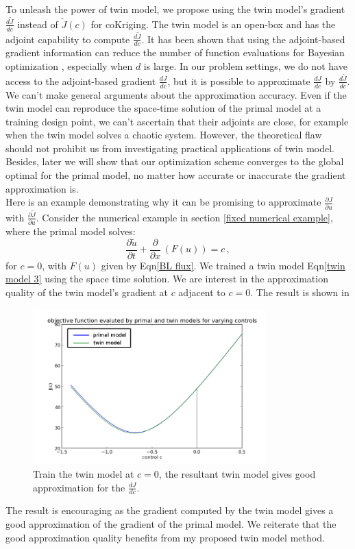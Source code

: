 \documentclass[a4paper,onecolumn]{article}
\theoremstyle{remark}
\begin{document}
\noindent To unleash the power of twin model, we propose using the twin model's gradient
$\frac{d\tilde{J}}{d c}$ instead of $\tilde{J}(c)$ for coKriging.
The twin model is an open-box and has the adjoint capability to compute $\frac{d\tilde{J}}{dc}$.
It has been shown that using the adjoint-based gradient information can 
reduce the number of function evaluations for Bayesian optimization
\cite{adjoint gradient cokriging without MLE, gradient kriging surrogate},
especially when $d$ is large. 
In our problem settings, we do not have access to the adjoint-based gradient $\frac{dJ}{dc}$,
but it is possible to approximate $\frac{dJ}{dc}$ by $\frac{d\tilde{J}}{dc}$.
We can't make general arguments about the approximation accuracy. 
Even if the twin model can reproduce the space-time solution of the primal model
at a training design point, we can't ascertain that their adjoints 
are close, for example when the twin model solves a chaotic system.
However, the theoretical flaw should not prohibit us from investigating
practical applications of twin model. Besides, later we will show that our optimization scheme 
converges to the global optimal for the primal model,
no matter how accurate or inaccurate the gradient approximation is.\\

\noindent Here is an example demonstrating why it can be promising to approximate
$\frac{\partial J}{\partial u}$ with $\frac{\partial \tilde{J}}{\partial u}$.
Consider the numerical example in section \ref{fixed numerical example}, where the
primal model solves:
\begin{equation}
    \frac{\partial \tilde{u}}{\partial t} + \frac{\partial}{\partial x}\,
    \left(F(u)\right) = c\,,
\end{equation}
for $c=0$, with $F(u)$ given by Eqn\eqref{BL flux}. We trained a twin model
Eqn\eqref{twin model 3} using the space time solution. We are interest in
the approximation quality of the twin model's gradient at $c$ adjacent to $c=0$.
The result is shown in 
\begin{figure}[H]\begin{center}
    \includegraphics[height=6cm]{J_twin_vs_primal.png}
    \caption{Train the twin model at $c=0$, the resultant twin model gives good approximation for
    the $\frac{dJ}{dc}$.}
\end{center}\end{figure}
\noindent The result is encouraging as the gradient computed by the twin model gives a good approximation
of the gradient of the primal model. We reiterate that the good approximation quality benefits from 
my proposed twin model method.
\end{document}
